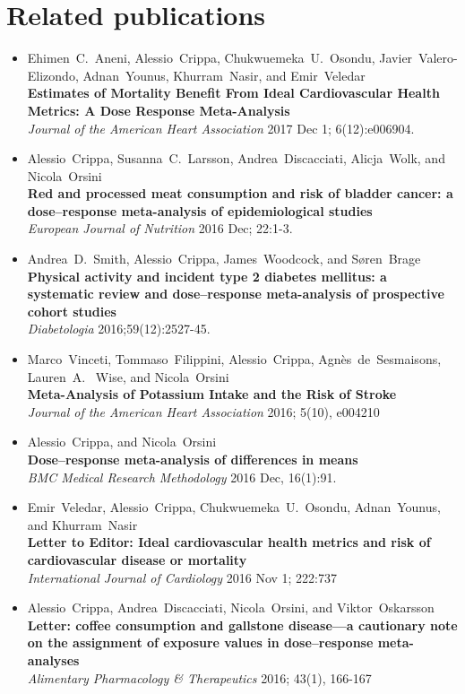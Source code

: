 \documentclass[11pt,a4paper,twoside,openany]{book}\usepackage{knitr}
\begin{document}
{{\chapter*{Related publications}
\begin{itemize}
\item Ehimen~C.~Aneni, Alessio~Crippa, Chukwuemeka~U.~Osondu, Javier~Valero-Elizondo, Adnan~Younus, Khurram~Nasir, and Emir~Veledar \\ \textbf{Estimates of Mortality Benefit From Ideal Cardiovascular Health Metrics: A Dose Response Meta-Analysis} \\ \textit{Journal of the American Heart Association} 2017 Dec 1; 6(12):e006904.
\item Alessio~Crippa, Susanna~C.~Larsson, Andrea~Discacciati, Alicja~Wolk, and Nicola~Orsini \\ \textbf{Red and processed meat consumption and risk of bladder cancer: a dose--response meta-analysis of epidemiological studies} \\ \textit{European Journal of Nutrition} 2016 Dec; 22:1-3.
\item Andrea~D.~Smith, Alessio~Crippa, James~Woodcock, and S{\o}ren~Brage \\ \textbf{Physical activity and incident type 2 diabetes mellitus: a systematic review and dose--response meta-analysis of prospective cohort studies} \\ \textit{Diabetologia} 2016;59(12):2527-45.
\item Marco~Vinceti, Tommaso~Filippini, Alessio~Crippa, Agn{\`e}s~de~Sesmaisons, Lauren~A.~ Wise, and Nicola~Orsini \\ \textbf{Meta-Analysis of Potassium Intake and the Risk of Stroke} \\ \textit{Journal of the American Heart Association} 2016; 5(10), e004210
\item Alessio~Crippa, and Nicola~Orsini \\ \textbf{Dose--response meta-analysis of differences in means} \\ \textit{BMC Medical Research Methodology} 2016 Dec, 16(1):91.
\item Emir~Veledar, Alessio~Crippa, Chukwuemeka~U.~Osondu, Adnan~Younus, and Khurram~Nasir \\ \textbf{Letter to Editor: Ideal cardiovascular health metrics and risk of cardiovascular disease or mortality} \\ \textit{International Journal of Cardiology} 2016 Nov 1; 222:737
\item Alessio~Crippa, Andrea~Discacciati, Nicola~Orsini, and Viktor~Oskarsson \\ \textbf{Letter: coffee consumption and gallstone disease---a cautionary note on the assignment of exposure values in dose--response meta-analyses} \\ \textit{Alimentary Pharmacology \& Therapeutics} 2016; 43(1), 166-167

\end{itemize}}}
\end{document}
